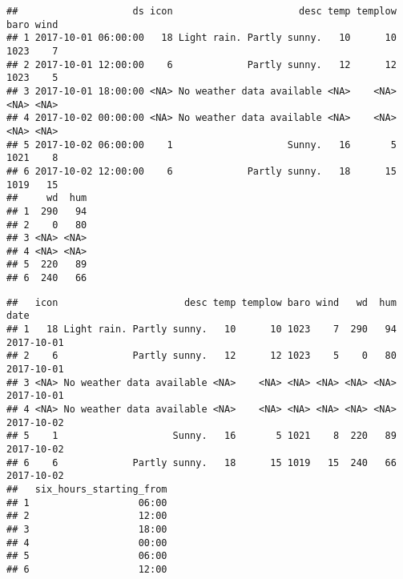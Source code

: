 \documentclass[
]{article}
\newenvironment{Shaded}{\begin{snugshade}}{\end{snugshade}}
\newcommand{\AttributeTok}[1]{\textcolor[rgb]{0.77,0.63,0.00}{#1}}
\newcommand{\CommentTok}[1]{\textcolor[rgb]{0.56,0.35,0.01}{\textit{#1}}}
\newcommand{\FunctionTok}[1]{\textcolor[rgb]{0.00,0.00,0.00}{#1}}
\newcommand{\NormalTok}[1]{#1}
\newcommand{\OtherTok}[1]{\textcolor[rgb]{0.56,0.35,0.01}{#1}}
\newcommand{\SpecialCharTok}[1]{\textcolor[rgb]{0.00,0.00,0.00}{#1}}
\newcommand{\StringTok}[1]{\textcolor[rgb]{0.31,0.60,0.02}{#1}}
\begin{document}
\begin{verbatim}
##                    ds icon                      desc temp templow baro wind
## 1 2017-10-01 06:00:00   18 Light rain. Partly sunny.   10      10 1023    7
## 2 2017-10-01 12:00:00    6             Partly sunny.   12      12 1023    5
## 3 2017-10-01 18:00:00 <NA> No weather data available <NA>    <NA> <NA> <NA>
## 4 2017-10-02 00:00:00 <NA> No weather data available <NA>    <NA> <NA> <NA>
## 5 2017-10-02 06:00:00    1                    Sunny.   16       5 1021    8
## 6 2017-10-02 12:00:00    6             Partly sunny.   18      15 1019   15
##     wd  hum
## 1  290   94
## 2    0   80
## 3 <NA> <NA>
## 4 <NA> <NA>
## 5  220   89
## 6  240   66
\end{verbatim}

\begin{Shaded}
\end{Shaded}

\begin{verbatim}
##   icon                      desc temp templow baro wind   wd  hum       date
## 1   18 Light rain. Partly sunny.   10      10 1023    7  290   94 2017-10-01
## 2    6             Partly sunny.   12      12 1023    5    0   80 2017-10-01
## 3 <NA> No weather data available <NA>    <NA> <NA> <NA> <NA> <NA> 2017-10-01
## 4 <NA> No weather data available <NA>    <NA> <NA> <NA> <NA> <NA> 2017-10-02
## 5    1                    Sunny.   16       5 1021    8  220   89 2017-10-02
## 6    6             Partly sunny.   18      15 1019   15  240   66 2017-10-02
##   six_hours_starting_from
## 1                   06:00
## 2                   12:00
## 3                   18:00
## 4                   00:00
## 5                   06:00
## 6                   12:00
\end{verbatim}
\end{document}
